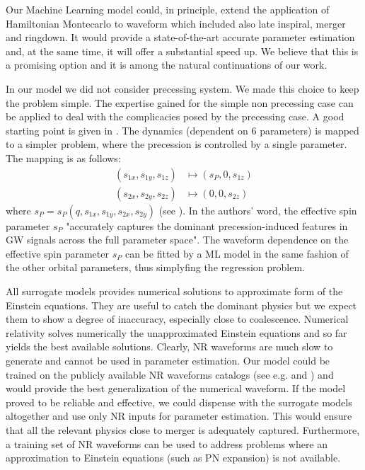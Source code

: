 Our Machine Learning model could, in principle, extend the application of Hamiltonian Montecarlo to waveform which included also late inspiral, merger and ringdown.
It would provide a state-of-the-art accurate parameter estimation and, at the same time, it will offer a substantial speed up.
We believe that this is a promising option and it is among the natural continuations of our work.
\par
In our model we did not consider precessing system. We made this choice to keep the problem simple.
The expertise gained for the simple non precessing case can be applied to deal with the complicacies posed by the precessing case.
A good starting point is given in \cite{Schmidt2015Precession}. The dynamics (dependent on 6 parameters) is mapped to a simpler problem, where the precession is controlled by a single parameter. The mapping is as follows:
\begin{align*}
	(s_{1x},s_{1y}, s_{1z}) &\longmapsto (s_{P},0, s_{1z})\\
	(s_{2x},s_{2y}, s_{2z}) &\longmapsto (0, 0, s_{2z})
\end{align*}
where $s_P = s_P(q,s_{1x},s_{1y}, s_{2x},s_{2y})$ (see \cite[eq. 3]{Schmidt2015Precession}).
In the authors' word, the effective spin parameter $s_{P}$ "accurately captures the dominant precession-induced features in GW signals across the full parameter space".
The waveform dependence on the effective spin parameter $s_P$ can be fitted by a ML model in the same fashion of the other orbital parameters, thus simplyfing the regression problem.
\par
All surrogate models provides numerical solutions to approximate form of the Einstein equations. They are useful to catch the dominant physics but we expect them to show a degree of inaccuracy, especially close to coalescence.
Numerical relativity solves numerically the unapproximated Einstein equations and so far yields the best available solutions.
Clearly, NR waveforms are much slow to generate and cannot be used in parameter estimation.
Our model could be trained on the publicly available NR waveforms catalogs (see e.g. \cite{Mroue2013NRWFcatalog} and \cite{Healy2017NRWFcatalog}) and would provide the best generalization of the numerical waveform.
If the model proved to be reliable and effective, we could dispense with the surrogate models altogether and use only NR inputs for parameter estimation. This would ensure that all the relevant physics close to merger is adequately captured.
Furthermore, a training set of NR waveforms can be used to address problems where an approximation to Einstein equations (such as PN expansion) is not available.
